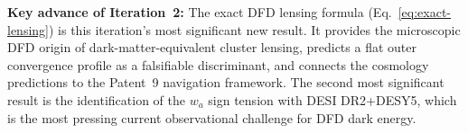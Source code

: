 \documentclass[11pt]{article}
\begin{document}
\bigskip\noindent
\textbf{Key advance of Iteration~2:} The exact DFD lensing formula
(Eq.~\ref{eq:exact-lensing}) is this iteration's most significant new
result.  It provides the microscopic DFD origin of dark-matter-equivalent
cluster lensing, predicts a flat outer convergence profile as a falsifiable
discriminant, and connects the cosmology predictions to the Patent~9
navigation framework.  The second most significant result is the
identification of the $w_a$ sign tension with DESI DR2+DESY5, which
is the most pressing current observational challenge for DFD dark energy.
\end{document}
